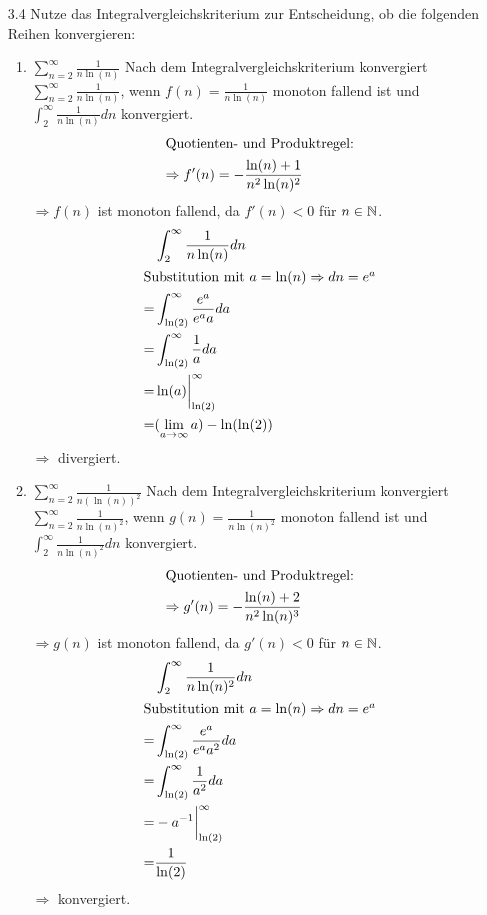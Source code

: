 \documentclass{HM}
\begin{document}
\begin{enumerate}
		\item[3.4] Nutze das Integralvergleichskriterium zur Entscheidung, ob die folgenden Reihen konvergieren:
		\begin{enumerate}
			\item $\sum\limits_{n=2}^\infty\frac{1}{n\ln(n)}$
			Nach dem Integralvergleichskriterium konvergiert $\sum\limits_{n=2}^\infty\frac{1}{n\ln(n)}$, wenn $f(n)=\frac{1}{n\ln(n)}$ monoton fallend ist und $\int_2^\infty\frac{1}{n\ln(n)}dn$ konvergiert.
			\begin{align*}
				\intertext{Quotienten- und Produktregel:}
				\Rightarrow f'(n)=-\frac{\ln(n)+1}{n^2\ln(n)^2}
			\end{align*}
			$\Rightarrow f(n)$ ist monoton fallend, da $f'(n)<0$ für $n\in\mathbb{N}$.
			\begin{align*}
				&\int_2^\infty\frac{1}{n\ln(n)}dn\\
				\intertext{Substitution mit $a=\ln(n)\Rightarrow dn=e^a$}
				=&\int_{\ln(2)}^\infty\frac{e^a}{e^aa}da\\
				=&\int_{\ln(2)}^\infty\frac{1}{a}da\\
				=&\ln(a)\biggr|_{\ln(2)}^\infty\\
				=&(\lim_{a\to\infty}a)-\ln(\ln(2))
			\end{align*}
			$\Rightarrow$ divergiert.
			
			\item $\sum\limits_{n=2}^\infty\frac{1}{n(\ln(n))^2}$
			Nach dem Integralvergleichskriterium konvergiert $\sum\limits_{n=2}^\infty\frac{1}{n\ln(n)^2}$, wenn $g(n)=\frac{1}{n\ln(n)^2}$ monoton fallend ist und $\int_2^\infty\frac{1}{n\ln(n)^2}dn$ konvergiert.
			\begin{align*}
				\intertext{Quotienten- und Produktregel:}
				\Rightarrow g'(n)=-\frac{\ln(n)+2}{n^2\ln(n)^3}
			\end{align*}
			$\Rightarrow g(n)$ ist monoton fallend, da $g'(n)<0$ für $n\in\mathbb{N}$.
			\begin{align*}
				&\int_2^\infty\frac{1}{n\ln(n)^2}dn\\
				\intertext{Substitution mit $a=\ln(n)\Rightarrow dn=e^a$}
				=&\int_{\ln(2)}^\infty\frac{e^a}{e^aa^2}da\\
				=&\int_{\ln(2)}^\infty\frac{1}{a^2}da\\
				=&-a^{-1}\biggr|_{\ln(2)}^\infty\\
				=&\frac{1}{\ln(2)}
			\end{align*}
			$\Rightarrow$ konvergiert.
		\end{enumerate}
		

\end{enumerate}
\end{document}
